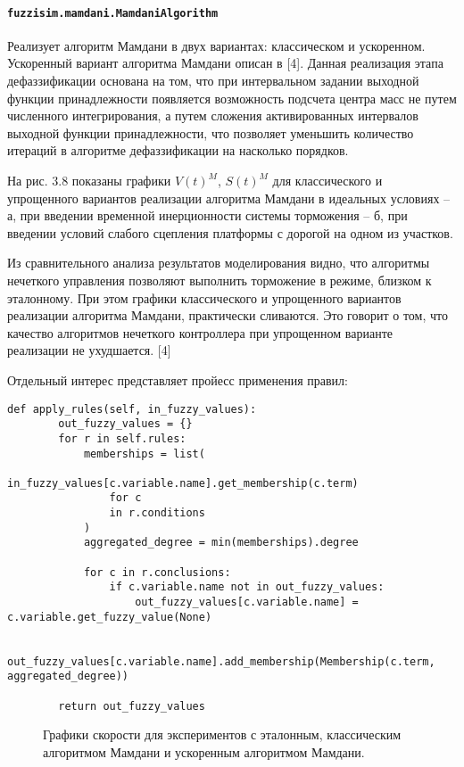 \paragraph{\lstinline!fuzzisim.mamdani.MamdaniAlgorithm!}

Реализует алгоритм Мамдани в двух вариантах: классическом и ускоренном. Ускоренный вариант алгоритма Мамдани описан в [4]. Данная реализация этапа дефаззификации основана на том, что при интервальном задании выходной функции принадлежности появляется возможность подсчета центра масс не путем численного интегрирования, а путем сложения активированных интервалов выходной функции принадлежности, что позволяет уменьшить количество итераций в алгоритме дефаззификации на насколько порядков.

На рис. 3.8 показаны графики $V(t)^M$, $S(t)^M$ для классического и упрощенного вариантов реализации  алгоритма Мамдани в идеальных условиях – а, при введении временной инерционности системы торможения – б, при введении условий слабого сцепления платформы с дорогой на одном из участков.

Из сравнительного анализа результатов моделирования  видно, что алгоритмы нечеткого управления позволяют выполнить торможение в режиме, близком к эталонному. При этом графики классического и упрощенного вариантов реализации алгоритма Мамдани,
практически сливаются. Это говорит о том, что качество алгоритмов нечеткого контроллера при упрощенном варианте реализации не ухудшается. [4]

Отдельный интерес представляет пройесс применения правил:

\begin{lstlisting}[style=pythonstyle,caption={  }, label=lst:func:1]
	def apply_rules(self, in_fuzzy_values):
		out_fuzzy_values = {}
		for r in self.rules:
			memberships = list(
				in_fuzzy_values[c.variable.name].get_membership(c.term)
				for c
				in r.conditions
			)
			aggregated_degree = min(memberships).degree

			for c in r.conclusions:
				if c.variable.name not in out_fuzzy_values:
					out_fuzzy_values[c.variable.name] = c.variable.get_fuzzy_value(None)

				out_fuzzy_values[c.variable.name].add_membership(Membership(c.term, aggregated_degree))

		return out_fuzzy_values
\end{lstlisting}

\begin{figure}[ht]
	\centering
	\caption{ Графики скорости для экспериментов с эталонным, классическим алгоритмом Мамдани и ускоренным алгоритмом Мамдани. }
\end{figure}

